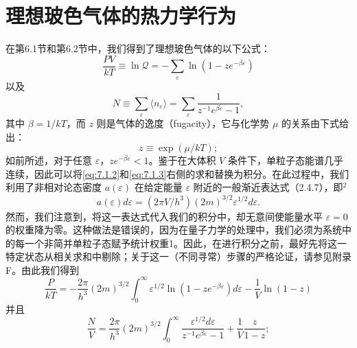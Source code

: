 \section{理想玻色气体的热力学行为}\label{ux7406ux60f3ux73bbux8272ux6c14ux4f53ux7684ux70edux529bux5b66ux884cux4e3a}
在第6.1节和第6.2节中，我们得到了理想玻色气体的以下公式：
\begin{equation}\tag{7.1.2}\label{eq:7.1.2}
\frac { P V } { k T } \equiv \ln \mathcal { Q } = - \sum _ { \varepsilon } \ln ( 1 - z e ^{- \beta \varepsilon} )
\end{equation}
以及
\begin{equation}\tag{7.1.3}\label{eq:7.1.3}
N \equiv \sum _ { \varepsilon } \langle n _ { \varepsilon } \rangle = \sum _ { \varepsilon } \frac { 1 } { z ^{- 1} e ^{\beta \varepsilon} - 1 } ,
\end{equation}
其中 \(\beta = 1/kT\)，而 \(z\) 则是气体的逸度（fugacity），它与化学势 \(\mu\) 的关系由下式给出：
\begin{equation}\tag{7.1.4}\label{eq:7.1.4}
z \equiv \exp ( \mu / k T ) ;
\end{equation}
如前所述，对于任意 \(\varepsilon\)，\(z e^{-\beta\varepsilon} < 1\)。鉴于在大体积 \(V\) 条件下，单粒子态能谱几乎连续，因此可以将\autoref{eq:7.1.2}和\autoref{eq:7.1.3}右侧的求和替换为积分。在此过程中，我们利用了非相对论态密度 \(a(\varepsilon)\) 在给定能量 \(\varepsilon\) 附近的一般渐近表达式（2.4.7），即\(^{2}\)
\begin{equation}\tag{7.1.5}\label{eq:7.1.5}
a ( \varepsilon ) d \varepsilon = ( 2 \pi V / h ^{3} ) ( 2 m ) ^{3 / 2} \varepsilon ^{1 / 2} d \varepsilon .
\end{equation}
然而，我们注意到，将这一表达式代入我们的积分中，却无意间使能量水平 \(\varepsilon=0\) 的权重降为零。这种做法是错误的，因为在量子力学的处理中，我们必须为系统中的每一个非简并单粒子态赋予统计权重1。因此，在进行积分之前，最好先将这一特定状态从相关求和中剔除；关于这一（不同寻常）步骤的严格论证，请参见附录F。由此我们得到
\begin{equation}\tag{7.1.6}\label{eq:7.1.6}
\frac { P } { k T } = - \frac { 2 \pi } { h ^{3} } ( 2 m ) ^{3 / 2} \int _ { 0 } ^{\infty} \varepsilon ^{1 / 2} \ln ( 1 - z e ^{- \beta \varepsilon} ) d \varepsilon - \frac { 1 } { V } \ln ( 1 - z )
\end{equation}
并且
\begin{equation}\tag{7.1.7}\label{eq:7.1.7}
\frac { N } { V } = \frac { 2 \pi } { h ^{3} } ( 2 m ) ^{3 / 2} \int _ { 0 } ^{\infty} \frac { \varepsilon ^{1 / 2} d \varepsilon } { z ^{- 1} e ^{\beta \varepsilon} - 1 } + \frac { 1 } { V } \frac { z } { 1 - z } ;
\end{equation}
